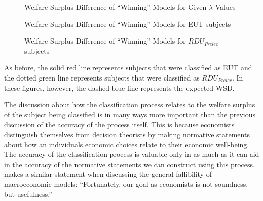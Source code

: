 \documentclass[../main.tex]{subfiles}
\begin{document}
\begin{figure}[ht!]
	\center
	\caption{Welfare Surplus Difference of \enquote{Winning} Models for Given $\lambda$ Values}
	\label{fig:HNG1_wel_mu}
\end{figure}

\begin{figure}[hb!]
	\center
	\caption{Welfare Surplus Difference of \enquote{Winning} Models for EUT subjects}
	\label{fig:HNG1_wel_eut}
\end{figure}

\begin{figure}[ht!]
	\center
	\caption{Welfare Surplus Difference of \enquote{Winning} Models for $\mathit{RDU_{Prelec}}$ subjects}
	\label{fig:HNG1_wel_pre}
\end{figure}

As before, the solid red line represents subjects that were classified as EUT and the dotted green line represents subjects that were classified as $\mathit{RDU_{Prelec}}$.
In these figures, however, the dashed blue line represents the expected WSD.



The discussion about how the classification process relates to the welfare surplus of the subject being classified is in many ways more important than the previous discussion of the accuracy of the process itself.
This is because economists distinguish themselves from decision theorists by making normative statements about how an individuals economic choices relate to their economic well-being.
The accuracy of the classification process is valuable only in as much as it can aid in the accuracy of the normative statements we can construct using this process.
\textcite[25]{Leamer2012} makes a similar statement when discussing the general fallibility of macroeconomic models: \enquote{Fortunately, our goal as economists is not soundness, but usefulness.}
\end{document}
